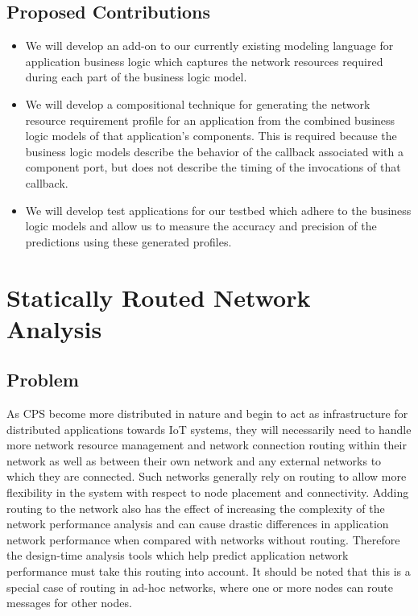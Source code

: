 \subsection{Proposed Contributions}
\begin{itemize}
	\item We will develop an add-on to our currently existing modeling language for application business logic which captures the network resources required during each part of the business logic model.
	\item We will develop a compositional technique for generating the network resource requirement profile for an application from the combined business logic models of that application's components.  This is required because the business logic models describe the behavior of the callback associated with a component port, but does not describe the timing of the invocations of that callback.
	\item We will develop test applications for our testbed which adhere to the business logic models and allow us to measure the accuracy and precision of the predictions using these generated profiles.
\end{itemize}

\newpage

\section{Statically Routed Network Analysis}
\label{sec:staticRoute}

\subsection{Problem}
As CPS become more distributed in nature and begin to act as infrastructure for distributed applications towards IoT systems, they will necessarily need to handle more network resource management and network connection routing within their network as well as between their own network and any external networks to which they are connected.  Such networks generally rely on routing to allow more flexibility in the system with respect to node placement and connectivity.  Adding routing to the network also has the effect of increasing the complexity of the network performance analysis and can cause drastic differences in application network performance when compared with networks without routing.  Therefore the design-time analysis tools which help predict application network performance must take this routing into account.  It should be noted that this is a special case of routing in ad-hoc networks, where one or more nodes can route messages for other nodes.  

